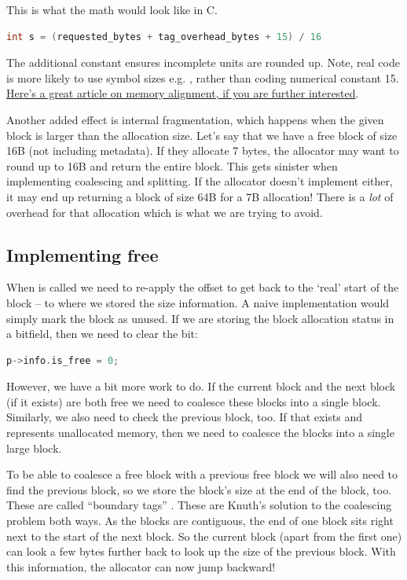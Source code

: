 This is what the math would look like in C.

\begin{lstlisting}[language=C]
int s = (requested_bytes + tag_overhead_bytes + 15) / 16
\end{lstlisting}

The additional constant ensures incomplete units are rounded up. Note, real code is more likely to use symbol sizes e.g. , rather than coding numerical constant 15.
\href{https://web.archive.org/web/20190313121701/https://www.ibm.com/developerworks/library/pa-dalign/}{Here's a great article on memory alignment, if you are further interested}.

Another added effect is internal fragmentation, which happens when the given block is larger than the allocation size.
Let's say that we have a free block of size 16B (not including metadata).
If they allocate 7 bytes, the allocator may want to round up to 16B and return the entire block.
This gets sinister when implementing coalescing and splitting.
If the allocator doesn't implement either, it may end up returning a block of size 64B for a 7B allocation!
There is a \emph{lot} of overhead for that allocation which is what we are trying to avoid.

\subsection{Implementing free}

When  is called we need to re-apply the offset to get back to the `real' start of the block -- to where we stored the size information.
A naive implementation would simply mark the block as unused.
If we are storing the block allocation status in a bitfield, then we need to clear the bit:

\begin{lstlisting}[language=C]
p->info.is_free = 0;
\end{lstlisting}

However, we have a bit more work to do.
If the current block and the next block (if it exists) are both free we need to coalesce these blocks into a single block.
Similarly, we also need to check the previous block, too.
If that exists and represents unallocated memory, then we need to coalesce the blocks into a single large block.

To be able to coalesce a free block with a previous free block we will also need to find the previous block, so we store the block's size at the end of the block, too.
These are called ``boundary tags'' \cite{knuth1973art}.
These are Knuth's solution to the coalescing problem both ways.
As the blocks are contiguous, the end of one block sits right next to the start of the next block.
So the current block (apart from the first one) can look a few bytes further back to look up the size of the previous block.
With this information, the allocator can now jump backward!

